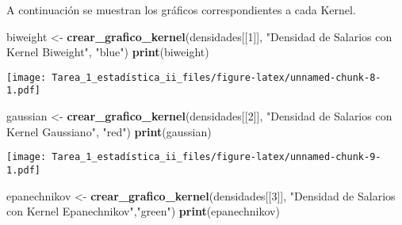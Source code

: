 \documentclass[
]{article}
\newenvironment{Shaded}{\begin{snugshade}}{\end{snugshade}}
\newcommand{\CommentTok}[1]{\textcolor[rgb]{0.56,0.35,0.01}{\textit{#1}}}
\newcommand{\ControlFlowTok}[1]{\textcolor[rgb]{0.13,0.29,0.53}{\textbf{#1}}}
\newcommand{\DecValTok}[1]{\textcolor[rgb]{0.00,0.00,0.81}{#1}}
\newcommand{\FunctionTok}[1]{\textcolor[rgb]{0.13,0.29,0.53}{\textbf{#1}}}
\newcommand{\NormalTok}[1]{#1}
\newcommand{\OtherTok}[1]{\textcolor[rgb]{0.56,0.35,0.01}{#1}}
\newcommand{\SpecialCharTok}[1]{\textcolor[rgb]{0.81,0.36,0.00}{\textbf{#1}}}
\newcommand{\StringTok}[1]{\textcolor[rgb]{0.31,0.60,0.02}{#1}}
\begin{document}
\begin{Shaded}
\end{Shaded}

A continuación se muestran los gráficos correspondientes a cada Kernel.

\begin{Shaded}
\begin{Highlighting}[]
\NormalTok{biweight }\OtherTok{\textless{}{-}} \FunctionTok{crear\_grafico\_kernel}\NormalTok{(densidades[[}\DecValTok{1}\NormalTok{]], }
                                 \StringTok{"Densidad de Salarios con Kernel Biweight"}\NormalTok{, }\StringTok{"blue"}\NormalTok{)}
\FunctionTok{print}\NormalTok{(biweight)}
\end{Highlighting}
\end{Shaded}

\texttt{[image: Tarea\_1\_estadística\_ii\_files/figure-latex/unnamed-chunk-8-1.pdf]}

\begin{Shaded}
\begin{Highlighting}[]
\NormalTok{gaussian }\OtherTok{\textless{}{-}} \FunctionTok{crear\_grafico\_kernel}\NormalTok{(densidades[[}\DecValTok{2}\NormalTok{]], }
                                 \StringTok{"Densidad de Salarios con Kernel Gaussiano"}\NormalTok{, }\StringTok{"red"}\NormalTok{)}
\FunctionTok{print}\NormalTok{(gaussian)}
\end{Highlighting}
\end{Shaded}

\texttt{[image: Tarea\_1\_estadística\_ii\_files/figure-latex/unnamed-chunk-9-1.pdf]}

\begin{Shaded}
\begin{Highlighting}[]
\NormalTok{epanechnikov }\OtherTok{\textless{}{-}} \FunctionTok{crear\_grafico\_kernel}\NormalTok{(densidades[[}\DecValTok{3}\NormalTok{]], }
                                     \StringTok{"Densidad de Salarios con Kernel Epanechnikov"}\NormalTok{,}\StringTok{"green"}\NormalTok{)}
\FunctionTok{print}\NormalTok{(epanechnikov)}
\end{Highlighting}
\end{Shaded}
\end{document}
